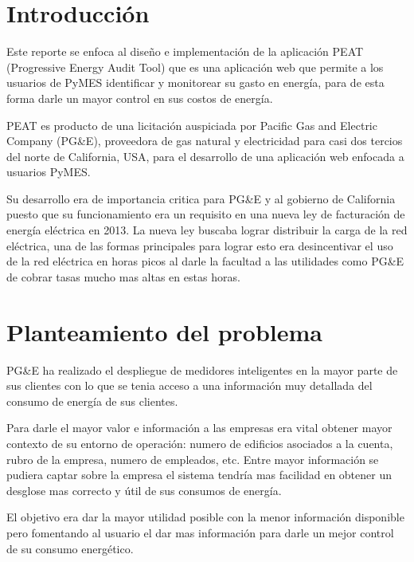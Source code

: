 \documentclass{book}
\begin{document}
\tableofcontents

\mainmatter

\section{Introducción}
Este reporte se enfoca al diseño e implementación de la aplicación
PEAT (Progressive Energy Audit Tool) que es una aplicación web que
permite a los usuarios de PyMES identificar y monitorear su gasto en
energía, para de esta forma darle un mayor control en sus costos de
energía.

PEAT es producto de una licitación auspiciada por Pacific Gas and
Electric Company (PG\&E), proveedora de gas natural y electricidad
para casi dos tercios del norte de California, USA, para
el desarrollo de una aplicación web enfocada a usuarios PyMES.

Su desarrollo era de importancia critica para PG\&E y al gobierno de
California puesto que su funcionamiento era un requisito en una nueva
ley de facturación de energía eléctrica en 2013. La nueva ley buscaba
lograr distribuir la carga de la red eléctrica, una de las formas
principales para lograr esto era desincentivar el uso de la red
eléctrica en horas picos al darle la facultad a las utilidades como PG\&E
de cobrar tasas mucho mas altas en estas horas.

\section{Planteamiento del problema}
PG\&E ha realizado el despliegue de medidores inteligentes en la
mayor parte de sus clientes con lo que se tenia acceso a una información
muy detallada del consumo de energía de sus clientes.

Para darle el mayor valor e información a las empresas era
vital obtener mayor contexto de su entorno de operación: numero
de edificios asociados a la cuenta, rubro de la empresa, numero de
empleados, etc. Entre mayor información se pudiera captar sobre la
empresa el sistema tendría mas facilidad en obtener un desglose
mas correcto y útil de sus consumos de energía.

El objetivo era dar la mayor utilidad posible con la menor
información disponible pero fomentando al usuario el dar mas
información para darle un mejor control de su consumo energético.
\end{document}
